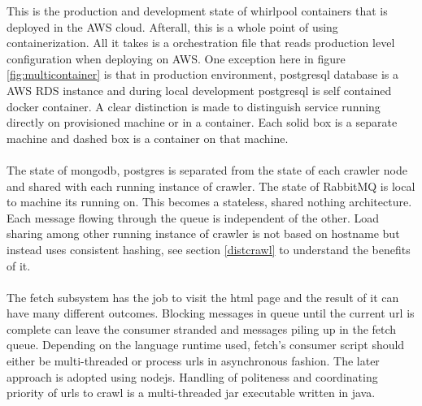 \noindent
This is the production and development state of whirlpool containers that is deployed in the AWS cloud.
Afterall, this is a whole point of using containerization. All it takes is a orchestration file that
reads production level configuration when deploying on AWS. One exception here in figure
\ref{fig:multicontainer} is that in production environment, postgresql database is a AWS RDS instance and
during local development postgresql is self contained docker container. A clear distinction is made to
distinguish service running directly on provisioned machine or in a container. Each solid box is a
separate machine and dashed box is a container on that machine.
\\
\\
\noindent
The state of mongodb, postgres is separated from the state of each crawler node and shared with each
running instance of crawler. The state of RabbitMQ is local to machine its running on. This becomes a
stateless, shared nothing architecture. Each message flowing through the queue is independent of the other.
Load sharing among other running instance of crawler is not based on hostname but instead uses
consistent hashing, see section \ref{distcrawl} to understand the benefits of it. 
\\
\\
\noindent
The fetch subsystem has the job to visit the html page and the result of it can have many different
outcomes. Blocking messages in queue until the current url is complete can leave the consumer stranded and
messages piling up in the fetch queue. Depending on the language runtime used, fetch's consumer script
should either be multi-threaded or process urls in asynchronous fashion. The later approach is adopted
using nodejs. Handling of politeness and coordinating priority of urls to crawl is a multi-threaded jar
executable written in java.
\pagebreak

